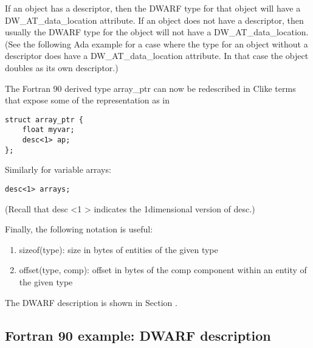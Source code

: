 If an object has a descriptor, then the DWARF type for that
object will have a DW\_AT\_data\_location attribute. If an object
does not have a descriptor, then usually the DWARF type for the
object will not have a DW\_AT\_data\_location. (See the following
Ada example for a case where the type for an object without
a descriptor does have a DW\_AT\_data\_location attribute. In
that case the object doubles as its own descriptor.)

The Fortran 90 derived type array\_ptr can now be redescribed
in C\dash like terms that expose some of the representation as in

\begin{lstlisting}
struct array_ptr {
    float myvar;
    desc<1> ap;
};
\end{lstlisting}

Similarly for variable arrays:
\begin{lstlisting}
desc<1> arrays;
\end{lstlisting}

(Recall that desc \textless 1 \textgreater 
indicates the 1\dash dimensional version of desc.)

Finally, the following notation is useful:

\begin{enumerate}[1.]
\item  sizeof(type): size in bytes of entities of the given type

\item offset(type, comp): offset in bytes of the comp component
within an entity of the given type
\end{enumerate}


The DWARF description is shown in 
Section .

\subsection{Fortran 90 example: DWARF description}
\label{app:fortran90exampledwarfdescription}

